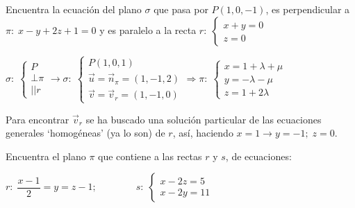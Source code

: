 \begin{ejre}
	Encuentra la ecuación del plano $\sigma$ que pasa por $P(1,0,-1)$, es perpendicular a $\pi:\;x-y+2z+1=0$ y es paralelo a la recta $r:\; \begin{cases} x+y=0\\z=0 \end{cases}$
\end{ejre}
\begin{proofw}\renewcommand{\qedsymbol}{$\diamond$}
$\sigma:\; \begin{cases} P\\ \bot \pi \\ || r \end{cases} \to \sigma:\; \begin{cases} P(1,0,1)\\ \vec u=\vec n_{\pi}=(1,-1,2) \\ \vec v=\vec v_r=(1,-1,0) \end{cases} \Rightarrow \pi:\; \begin{cases} x=1+\lambda+\mu \\ y=-\lambda-\mu \\ z=1+2\lambda \end{cases}$

\vspace{2mm}\noindent \textcolor{gris}{Para encontrar $\vec v_r$ se ha buscado una solución particular de las ecuaciones generales `homogéneas' (ya lo son) de $r$, así, haciendo $x=1\to y=-1;\; z=0$}.
\end{proofw}




\begin{ejre}
	Encuentra el plano $\pi$ que contiene a las rectas $r$ y $s$, de ecuaciones:
	
	$r:\; \dfrac{x-1}{2}=y=z-1;\qquad \qquad s:\; \begin{cases} x-2z=5\\x-2y=11 \end{cases}$
\end{ejre}

